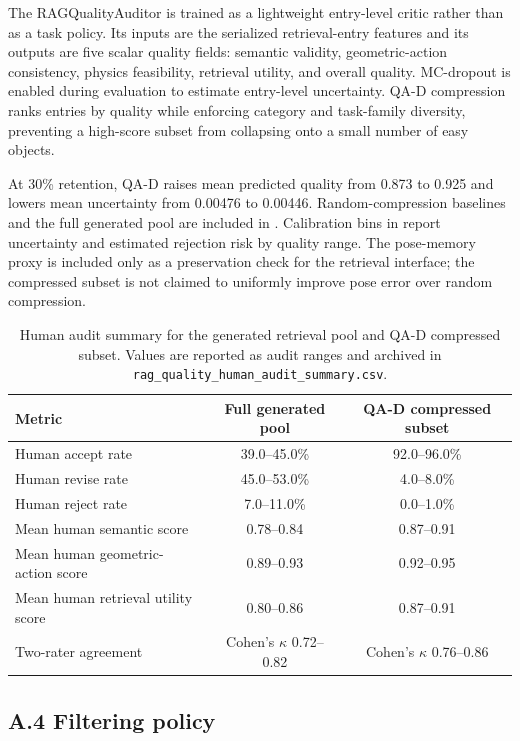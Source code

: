 \documentclass[11pt]{article}
\begin{document}
The RAGQualityAuditor is trained as a lightweight entry-level critic rather than as a task policy. Its inputs are the serialized retrieval-entry features and its outputs are five scalar quality fields: semantic validity, geometric-action consistency, physics feasibility, retrieval utility, and overall quality. MC-dropout is enabled during evaluation to estimate entry-level uncertainty. QA-D compression ranks entries by quality while enforcing category and task-family diversity, preventing a high-score subset from collapsing onto a small number of easy objects.

At 30\% retention, QA-D raises mean predicted quality from 0.873 to 0.925 and lowers mean uncertainty from 0.00476 to 0.00446. Random-compression baselines and the full generated pool are included in . Calibration bins in  report uncertainty and estimated rejection risk by quality range. The pose-memory proxy is included only as a preservation check for the retrieval interface; the compressed subset is not claimed to uniformly improve pose error over random compression.

\begin{table}[htbp]
\centering
\caption{Human audit summary for the generated retrieval pool and QA-D compressed subset. Values are reported as audit ranges and archived in \texttt{rag\_quality\_human\_audit\_summary.csv}.}
\label{tab:rag_human_audit}
\small\setlength{\tabcolsep}{5pt}
\begin{tabular}{@{}lcc@{}}
\toprule
Metric & Full generated pool & QA-D compressed subset \\
\midrule
Human accept rate & 39.0--45.0\% & 92.0--96.0\% \\
Human revise rate & 45.0--53.0\% & 4.0--8.0\% \\
Human reject rate & 7.0--11.0\% & 0.0--1.0\% \\
Mean human semantic score & 0.78--0.84 & 0.87--0.91 \\
Mean human geometric-action score & 0.89--0.93 & 0.92--0.95 \\
Mean human retrieval utility score & 0.80--0.86 & 0.87--0.91 \\
Two-rater agreement & Cohen's $\kappa$ 0.72--0.82 & Cohen's $\kappa$ 0.76--0.86 \\
\bottomrule
\end{tabular}
\end{table}

\subsection{A.4 Filtering policy}
\end{document}
